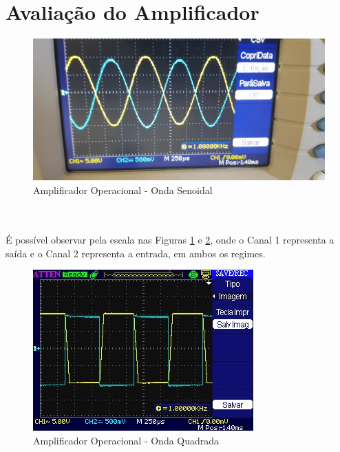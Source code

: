 \documentclass[14pt, oneside]{book}
\newcommand\tab[1][1cm]{\hspace*{#1}}
\theoremstyle{definition}
\begin{document}
            \section{Avaliação do Amplificador}
                \begin{figure}[h]
                    \centering
                    \includegraphics[scale = 0.10]{seno.jpg}
                    \caption{Amplificador Operacional - Onda Senoidal}
                    \label{seno}
                \end{figure}            
                \\~\\
                \tab É possível observar pela escala nas Figuras \ref{seno} e \ref{quadrada}, onde o Canal 1 representa a saída e o Canal 2 representa a entrada, em ambos os regimes.
                
                \begin{figure}[H]
                    \centering
                    \includegraphics[scale = 1.0]{quadrado.jpg}
                    \caption{Amplificador Operacional - Onda Quadrada}
                    \label{quadrada}
                \end{figure}
            
\end{document}
